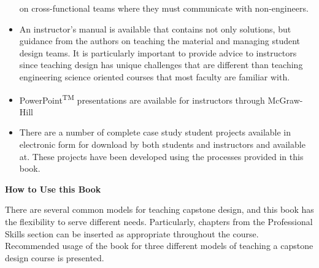 \begin{itemize}
  on cross-functional teams where they must communicate with
  non-engineers.
\item
  An instructor's manual is available that 
  contains not only solutions, but guidance from the authors on teaching
  the material and managing student design teams. It is particularly
  important to provide advice to instructors since teaching design has
  unique challenges that are different than teaching engineering science
  oriented courses that most faculty are familiar with.
\item
  PowerPoint\textsuperscript{TM} presentations are available for
  instructors through McGraw-Hill
\item
  There are a number of complete case study student projects available
  in electronic form for download by both students and instructors and
  available at.
  These projects have been developed using the processes provided in
  this book.
\end{itemize}

\textbf{How to Use this Book}

There are several common models for teaching capstone design, and this
book has the flexibility to serve different needs. Particularly,
chapters from the Professional Skills section can be inserted as
appropriate throughout the course. Recommended usage of the book for
three different models of teaching a capstone design course is
presented.

